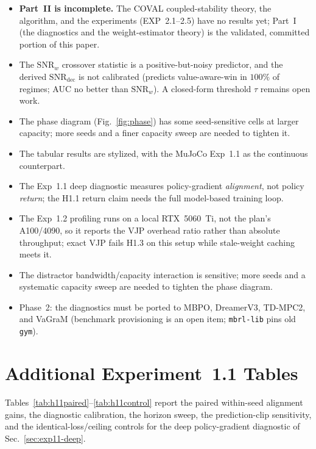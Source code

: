 \documentclass{article}
\theoremstyle{plain}
\begin{document}
\begin{itemize}
\item \textbf{Part~II is incomplete.} The COVAL coupled-stability theory, the algorithm,
  and the experiments (EXP~2.1--2.5) have no results yet; Part~I (the diagnostics and the
  weight-estimator theory) is the validated, committed portion of this paper.
\item The $\mathrm{SNR}_w$ crossover statistic is a positive-but-noisy predictor, and
  the derived $\mathrm{SNR}_{\mathrm{dec}}$ is not calibrated (predicts value-aware-win
  in $100\%$ of regimes; AUC no better than $\mathrm{SNR}_w$). A closed-form threshold
  $\tau$ remains open work.
\item The phase diagram (Fig.~\ref{fig:phase}) has some seed-sensitive cells at larger
  capacity; more seeds and a finer capacity sweep are needed to tighten it.
\item The tabular results are stylized, with the MuJoCo Exp~1.1 as the continuous
  counterpart.
\item The Exp~1.1 deep diagnostic measures policy-gradient \emph{alignment}, not policy
  \emph{return}; the H1.1 return claim needs the full model-based training loop.
\item The Exp~1.2 profiling runs on a local RTX~5060~Ti, not the plan's A100/4090, so it
  reports the VJP overhead ratio rather than absolute throughput; exact VJP fails H1.3 on
  this setup while stale-weight caching meets it.
\item The distractor bandwidth/capacity interaction is sensitive; more seeds and a
  systematic capacity sweep are needed to tighten the phase diagram.
\item Phase~2: the diagnostics must be ported to MBPO, DreamerV3, TD-MPC2, and VaGraM
  (benchmark provisioning is an open item; \texttt{mbrl-lib} pins old \texttt{gym}).
\end{itemize}




\newpage
\appendix
\onecolumn

\section{Additional Experiment~1.1 Tables}
\label{app:h11}

Tables~\ref{tab:h11paired}--\ref{tab:h11control} report the paired within-seed
alignment gains, the diagnostic calibration, the horizon sweep, the prediction-clip
sensitivity, and the identical-loss/ceiling controls for the deep policy-gradient
diagnostic of Sec.~\ref{sec:exp11-deep}.
\end{document}
